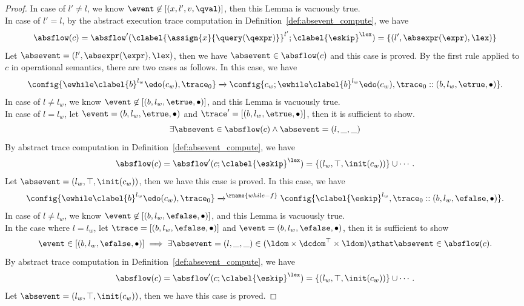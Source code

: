 \begin{proof}
  In case of $l' \neq l$, we know $\event \not\in [({x}, l', v, \qval)]$, then this Lemma is vacuously true.
  \\
  In case of $l' = l$, by the abstract execution trace computation in Definition~\ref{def:absevent_compute}, we have 
  \[
    \absflow(c) = \absflow'(\clabel{\assign{x}{\query(\qexpr)}}^{l'}; \clabel{\eskip}^{\lex}) = \{(l', \absexpr(\expr), \lex)\}
  \]
  Let $\absevent = (l', \absexpr(\expr), \lex) $, then we have $\absevent \in \absflow(c)$ and this case is proved.
  By the first rule applied to $c$ in operational semantics, there are two cases as follows.
  In this case, we have
  \[
    \config{{\ewhile \clabel{b}^{l_w} \edo (c_w), \trace_0}}
    \xrightarrow{} 
    \config{{
    c_w; \ewhile \clabel{b}^{l_w} \edo (c_w),
    \trace_0 :: (b, l_w, \etrue, \bullet)}}.
  \]
  In case of $l \neq l_w$, we know $\event \not \in [(b, l_w, \etrue, \bullet)]$, and this Lemma is vacuously true.
  \\
  In case of $l = l_w$, let $\event = (b, l_w, \etrue, \bullet)$ and $\trace' =  [(b, l_w, \etrue, \bullet)]$, then it is sufficient to show.
    \[
      \exists 
      \absevent \in \absflow(c) \land \absevent = (l, \_, \_)
    \]
    By abstract trace computation in Definition~\ref{def:absevent_compute}, we have
    \[
      \absflow(c) = \absflow'(c; \clabel{\eskip}^{\lex}) = \{(l_w, \top, \init(c_w))\} \cup \cdots.
    \]
    Let $\absevent = (l_w, \top, \init(c_w))$, then we have this case is proved.
  In this case, we have
  \[
    \config{{\ewhile \clabel{b}^{l_w} \edo (c_w), \trace_0}}
    \xrightarrow{}^\rname{while-f}
    \config{{
      \clabel{\eskip}^{l_w},
    \trace_0 :: (b, l_w, \efalse, \bullet)}}.
  \]
  In case of $l \neq l_w$, we know $\event \not\in [(b, l_w, \efalse, \bullet)]$, and this Lemma is vacuously true.
  \\
  In the case where $l = l_w$, 
  let $\trace = [(b, l_w, \efalse, \bullet)]$ and $\event = (b, l_w, \efalse, \bullet)$,
  then it is sufficient to show
    \[
      \event \in [(b, l_w, \efalse, \bullet)]
      \implies
      \exists \absevent = (l, \_, \_) \in (\ldom\times \dcdom^{\top} \times \ldom) \sthat 
      \absevent \in \absflow(c).
    \]
  By abstract trace computation in Definition~\ref{def:absevent_compute}, we have
  \[
    \absflow(c) = \absflow'(c; \clabel{\eskip}^{\lex}) = \{(l_w, \top, \init(c_w))\} \cup \cdots.
  \]
  Let $\absevent = (l_w, \top, \init(c_w))$, then we have this case is proved.

\end{proof}
